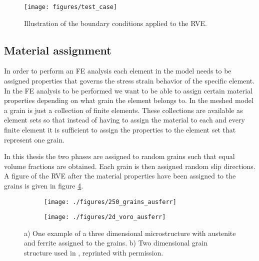 \documentclass[crystal_plast.tex]{subfiles}
\begin{document}
\begin{figure}[htpb!]
\centering
\texttt{[image: figures/test\_case]}
\caption{Illustration of the boundary conditions applied to the RVE.}
\label{fig:test_case_cryst}
\end{figure}

\subsection{Material assignment}

In order to perform an FE analysis each element in the model needs to be assigned properties that governs the stress strain behavior of the specific element. In the FE analysis to be performed we want to be able to assign certain material properties depending on what grain the element belongs to. In the meshed model a grain is just a collection of finite elements. These collections are available as element sets so that instead of having to assign the material to each and every finite element it is sufficient to assign the properties to the element set that represent one grain.

In this thesis the two phases are assigned to random grains such that equal volume fractions are obtained. Each grain is then assigned random slip directions. A figure of the RVE after the material properties have been assigned to the grains is given in figure \ref{fig:ausferr}. 


 \begin{figure}[htpb!]
\centering
\begin{subfigure}{.5\textwidth}
  \centering
  \texttt{[image: ./figures/250\_grains\_ausferr]}
  \caption{}
  \label{fig:ausferr_3d}
\end{subfigure}%
\begin{subfigure}{.6\textwidth}
  \centering
  \texttt{[image: ./figures/2d\_voro\_ausferr]}
  \caption{}
  \label{fig:ausferr_2d}
\end{subfigure}
\caption{a) One example of a three dimensional microstructure with austenite and ferrite assigned to the grains.  b) Two dimensional grain structure used in \cite{lillbacka2007multiscale}, reprinted with permission.}
\label{fig:ausferr}
\end{figure}
\end{document}
